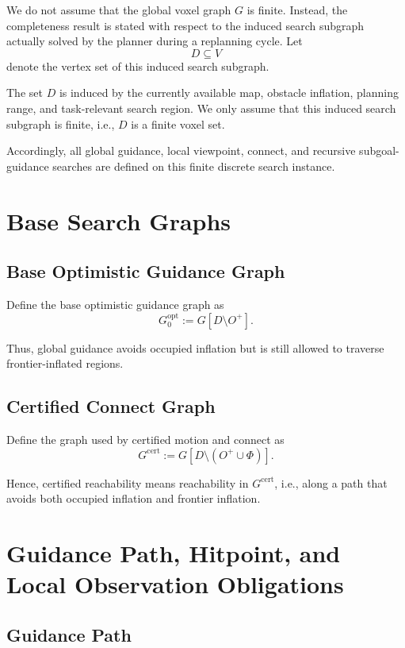 \documentclass[11pt]{article}
\begin{document}
We do not assume that the global voxel graph $G$ is finite. Instead, the completeness result is stated with respect to the induced search subgraph actually solved by the planner during a replanning cycle. Let
\[
D\subseteq V
\]
denote the vertex set of this induced search subgraph.

The set $D$ is induced by the currently available map, obstacle inflation, planning range, and task-relevant search region. We only assume that this induced search subgraph is finite, i.e., $D$ is a finite voxel set.

Accordingly, all global guidance, local viewpoint, connect, and recursive subgoal-guidance searches are defined on this finite discrete search instance.

\section{Base Search Graphs}

\subsection{Base Optimistic Guidance Graph}

Define the base optimistic guidance graph as
\[
G^{\mathrm{opt}}_0 := G[D\setminus O^{+}].
\]

Thus, global guidance avoids occupied inflation but is still allowed to traverse frontier-inflated regions.

\subsection{Certified Connect Graph}

Define the graph used by certified motion and connect as
\[
G^{\mathrm{cert}} := G[D\setminus (O^{+}\cup \Phi)].
\]

Hence, certified reachability means reachability in $G^{\mathrm{cert}}$, i.e., along a path that avoids both occupied inflation and frontier inflation.

\section{Guidance Path, Hitpoint, and Local Observation Obligations}

\subsection{Guidance Path}
\end{document}

